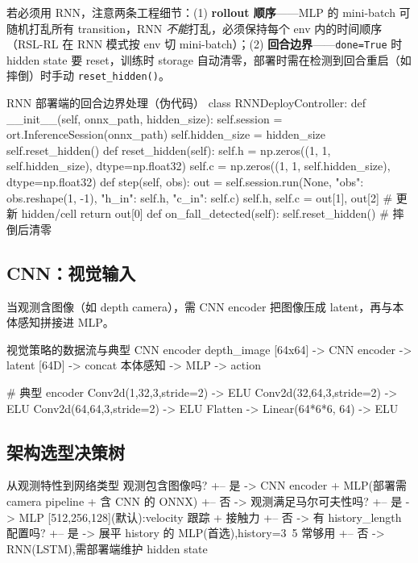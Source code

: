 若必须用 RNN，注意两条工程细节：(1) \textbf{rollout 顺序}——MLP 的 mini-batch 可随机打乱所有 transition，RNN \emph{不能}打乱，必须保持每个 env 内的时间顺序（RSL-RL 在 RNN 模式按 env 切 mini-batch）；(2) \textbf{回合边界}——\verb|done=True| 时 hidden state 要 reset，训练时 storage 自动清零，部署时需在检测到回合重启（如摔倒）时手动 \verb|reset_hidden()|。

\begin{codebox}[Python]{RNN 部署端的回合边界处理（伪代码）}
class RNNDeployController:
    def __init__(self, onnx_path, hidden_size):
        self.session = ort.InferenceSession(onnx_path)
        self.hidden_size = hidden_size
        self.reset_hidden()
    def reset_hidden(self):
        self.h = np.zeros((1, 1, self.hidden_size), dtype=np.float32)
        self.c = np.zeros((1, 1, self.hidden_size), dtype=np.float32)
    def step(self, obs):
        out = self.session.run(None,
            {"obs": obs.reshape(1, -1), "h_in": self.h, "c_in": self.c})
        self.h, self.c = out[1], out[2]      # 更新 hidden/cell
        return out[0]
    def on_fall_detected(self):
        self.reset_hidden()                  # 摔倒后清零
\end{codebox}

\subsection{CNN：视觉输入}

当观测含图像（如 depth camera），需 CNN encoder 把图像压成 latent，再与本体感知拼接进 MLP。

\begin{codebox}[text]{视觉策略的数据流与典型 CNN encoder}
depth_image [64x64] -> CNN encoder -> latent [64D] -> concat 本体感知 -> MLP -> action

# 典型 encoder
Conv2d(1,32,3,stride=2) -> ELU
Conv2d(32,64,3,stride=2) -> ELU
Conv2d(64,64,3,stride=2) -> ELU
Flatten -> Linear(64*6*6, 64) -> ELU
\end{codebox}

\subsection{架构选型决策树}

\begin{codebox}[text]{从观测特性到网络类型}
观测包含图像吗?
+-- 是 -> CNN encoder + MLP(部署需 camera pipeline + 含 CNN 的 ONNX)
+-- 否 -> 观测满足马尔可夫性吗?
          +-- 是 -> MLP [512,256,128](默认):velocity 跟踪 + 接触力
          +-- 否 -> 有 history_length 配置吗?
                    +-- 是 -> 展平 history 的 MLP(首选),history=3~5 常够用
                    +-- 否 -> RNN(LSTM),需部署端维护 hidden state
\end{codebox}

